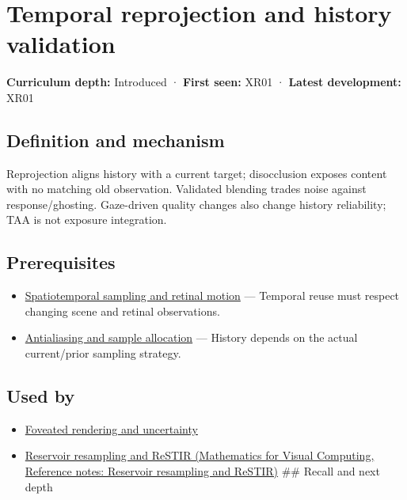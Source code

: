 \hypertarget{appendix-0727340a4428}{}\label{referencestart:appendix-0727340a4428}
\section{Temporal reprojection and history validation}\label{appendix-0727340a4428-temporal-reprojection-and-history-validation}

\textbf{Curriculum depth:} Introduced · \textbf{First seen:} XR01 · \textbf{Latest development:} XR01

\begin{allmightroledefinition}

\subsection{Definition and mechanism}\label{appendix-0727340a4428-definition-and-mechanism}

Reprojection aligns history with a current target; disocclusion exposes content with no matching old observation. Validated blending trades noise against response/ghosting. Gaze-driven quality changes also change history reliability; TAA is not exposure integration.

\end{allmightroledefinition}

\subsection{Prerequisites}\label{appendix-0727340a4428-prerequisites}

\begin{itemize}
\tightlist
\item
  \hyperref[appendix-70895739febb]{Spatiotemporal sampling and retinal motion} --- Temporal reuse must respect changing scene and retinal observations.
\item
  \hyperref[appendix-4192b2bdd21e]{Antialiasing and sample allocation} --- History depends on the actual current/prior sampling strategy.
\end{itemize}

\subsection{Used by}\label{appendix-0727340a4428-used-by}

\begin{itemize}
\item
  \hyperref[appendix-5878b813b732]{Foveated rendering and uncertainty}
\item
  \href{../02-Mathematics-for-Visual-Computing/main.pdf\#nameddest=appendix-68be451b78b1}{Reservoir resampling and ReSTIR (Mathematics for Visual Computing, Reference notes: Reservoir resampling and ReSTIR)} \#\# Recall and next depth
\end{itemize}

